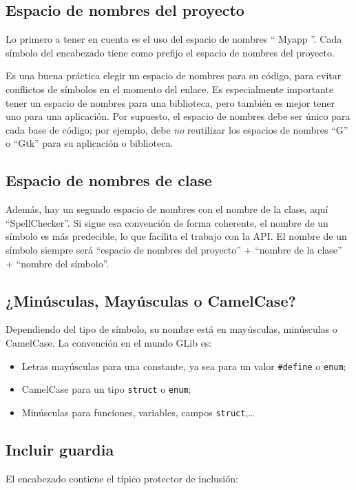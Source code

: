 \subsection{Espacio de nombres del proyecto}
Lo primero a tener en cuenta es el uso del espacio de nombres `` Myapp ''. Cada símbolo del encabezado tiene como prefijo el espacio de nombres del proyecto.

Es una buena práctica elegir un espacio de nombres para su código, para evitar conflictos de símbolos en el momento del enlace. Es especialmente importante tener un espacio de nombres para una biblioteca, pero también es mejor tener uno para una aplicación. Por supuesto, el espacio de nombres debe ser único para cada base de código; por ejemplo, debe \emph{no} reutilizar los espacios de nombres ``G'' o ``Gtk'' para su aplicación o biblioteca.

\subsection{Espacio de nombres de clase}
Además, hay un segundo espacio de nombres con el nombre de la clase, aquí ``SpellChecker''. Si sigue esa convención de forma coherente, el nombre de un símbolo es más predecible, lo que facilita el trabajo con la API. El nombre de un símbolo siempre será ``espacio de nombres del proyecto'' + ``nombre de la clase'' + ``nombre del símbolo''.

\subsection{¿Minúsculas, Mayúsculas o CamelCase?}
Dependiendo del tipo de símbolo, su nombre está en mayúsculas, minúsculas o CamelCase. La convención en el mundo GLib es:
\begin{itemize}
    \item Letras mayúsculas para una constante, ya sea para un valor \lstinline{#define} o \lstinline{enum};
    \item CamelCase para un tipo \lstinline{struct} o \lstinline{enum};
    \item Minúsculas para funciones, variables, campos \lstinline{struct},…
\end{itemize}

\subsection{Incluir guardia}
El encabezado contiene el típico protector de inclusión:

